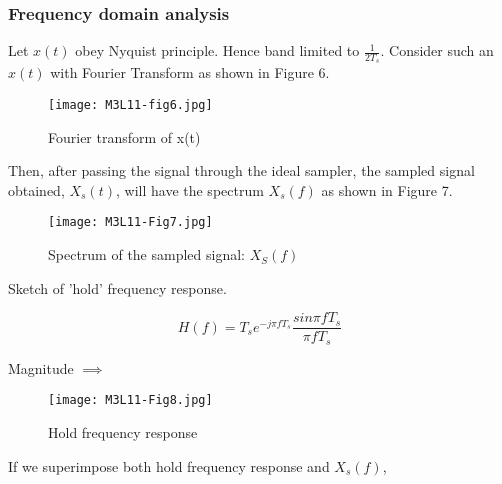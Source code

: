 



\subsubsection{Frequency domain analysis}

Let $x(t)$ obey Nyquist principle. Hence band limited to $\frac{1}{2 T_s}$.
Consider such an $x(t)$ with Fourier Transform as shown in Figure 6.

\begin{figure}[ht]
\centering
\texttt{[image: M3L11-fig6.jpg]}
\caption{Fourier transform of x(t)}
\end{figure}

Then, after passing the signal through the ideal sampler, the sampled signal obtained, $X_s(t)$, will have the spectrum $X_s(f)$ as shown in Figure 7.


\begin{figure}[ht]
\centering
\texttt{[image: M3L11-Fig7.jpg]}
\caption{Spectrum of the sampled signal: $X_{S}(f)$}
\end{figure}

Sketch of 'hold' frequency response.

$$ H(f) = T_s e^{-j \pi fT_s}\frac{sin \pi fT_s}{\pi fT_s}$$

Magnitude $\implies$

\begin{figure}[ht]
\centering
\texttt{[image: M3L11-Fig8.jpg]}
\caption{Hold frequency response}
\end{figure}

If we superimpose both hold frequency response and $X_s(f)$,

